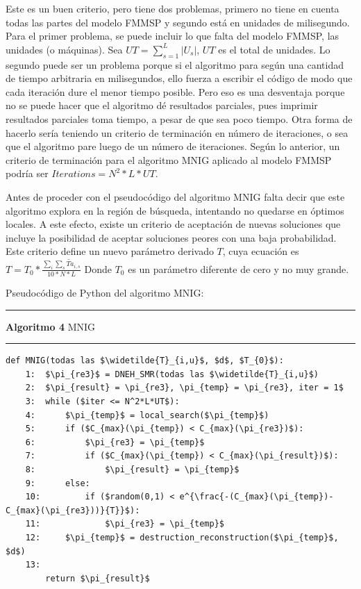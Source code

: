 \documentclass{article}
\begin{document}
\vspace{\baselineskip}
Este es un buen criterio, pero tiene dos problemas, primero no tiene en cuenta todas las partes del modelo FMMSP y segundo está en unidades de milisegundo. Para el primer problema, se puede incluir lo que falta del modelo FMMSP, las unidades (o máquinas). Sea $UT = \sum_{s = 1}^{L}|U_{s}|$, $UT$ es el total de unidades. Lo segundo puede ser un problema porque si el algoritmo para según una cantidad de tiempo arbitraria en milisegundos, ello fuerza a escribir el código de modo que cada iteración dure el menor tiempo posible. Pero eso es una desventaja porque no se puede hacer que el algoritmo dé resultados parciales, pues imprimir resultados parciales toma tiempo, a pesar de que sea poco tiempo. Otra forma de hacerlo sería teniendo un criterio de terminación en número de iteraciones, o sea que el algoritmo pare luego de un número de iteraciones. Según lo anterior, un criterio de terminación para el algoritmo MNIG aplicado al modelo FMMSP podría ser $Iterations = N^2*L*UT$.

\vspace{\baselineskip}
Antes de proceder con el pseudocódigo del algoritmo MNIG falta decir que este algoritmo explora en la región de búsqueda, intentando no quedarse en óptimos locales. A este efecto, existe un criterio de aceptación de nuevas soluciones que incluye la posibilidad de aceptar soluciones peores con una baja probabilidad. Este criterio define un nuevo parámetro derivado $T$, cuya ecuación es $T = T_{0}*\frac{\sum_{i}\sum_{s}\widetilde{Ta}_{i,s}}{10*N*L}$ Donde $T_{0}$ es un parámetro diferente de cero y no muy grande. \autocite{algMNIG}

\vspace{\baselineskip}
Pseudocódigo de Python del algoritmo MNIG:

\noindent\noindent
\rule{\linewidth}{0.4pt}

\textbf{Algoritmo 4} MNIG

\noindent\noindent
\rule{\linewidth}{0.4pt}

\begin{lstlisting}[mathescape=true]
    def MNIG(todas las $\widetilde{T}_{i,u}$, $d$, $T_{0}$):
    1:  $\pi_{re3}$ = DNEH_SMR(todas las $\widetilde{T}_{i,u}$)
    2:  $\pi_{result} = \pi_{re3}, \pi_{temp} = \pi_{re3}, iter = 1$
    3:  while ($iter <= N^2*L*UT$):
    4:      $\pi_{temp}$ = local_search($\pi_{temp}$)
    5:      if ($C_{max}(\pi_{temp}) < C_{max}(\pi_{re3})$):
    6:          $\pi_{re3} = \pi_{temp}$
    7:          if ($C_{max}(\pi_{temp}) < C_{max}(\pi_{result})$):
    8:              $\pi_{result} = \pi_{temp}$
    9:      else:
    10:         if ($random(0,1) < e^{\frac{-(C_{max}(\pi_{temp})-C_{max}(\pi_{re3}))}{T}}$):
    11:             $\pi_{re3} = \pi_{temp}$
    12:     $\pi_{temp}$ = destruction_reconstruction($\pi_{temp}$, $d$)
    13:
        return $\pi_{result}$
\end{lstlisting}
\end{document}
